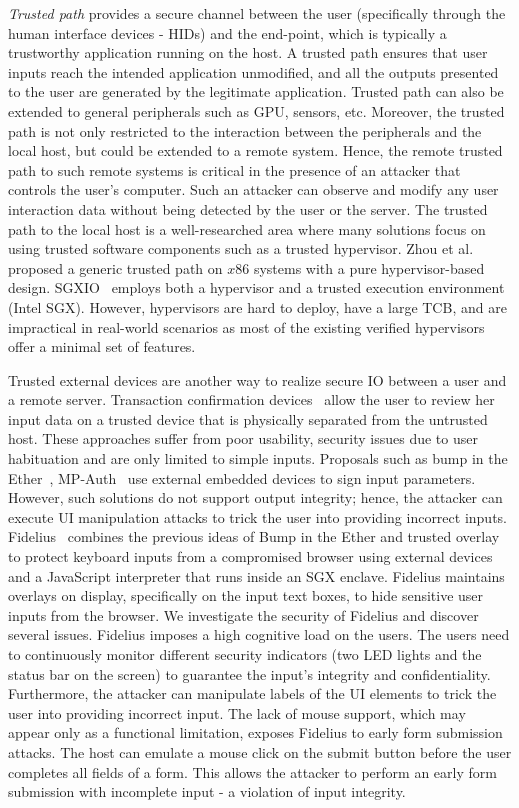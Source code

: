 \emph{Trusted path} provides a secure channel between the user (specifically through the human interface devices - HIDs) and the end-point, which is typically a trustworthy application running on the host. A trusted path ensures that user inputs reach the intended application unmodified, and all the outputs presented to the user are generated by the legitimate application. Trusted path can also be extended to general peripherals such as GPU, sensors, etc. Moreover, the trusted path is not only restricted to the interaction between the peripherals and the local host, but could be extended to a remote system. Hence, the remote trusted path to such remote systems is critical in the presence of an attacker that controls the user's computer. Such an attacker can observe and modify any user interaction data without being detected by the user or the server. The trusted path to the local host is a well-researched area where many solutions focus on using trusted software components such as a trusted hypervisor. Zhou et al.~\cite{zhou2012building} proposed a generic trusted path on $x86$ systems with a pure hypervisor-based design. SGXIO~\cite{weiser2017sgxio} employs both a hypervisor and a trusted execution environment (Intel SGX). However, hypervisors are hard to deploy, have a large TCB, and are impractical in real-world scenarios as most of the existing verified hypervisors offer a minimal set of features.


Trusted external devices are another way to realize secure IO between a user and a remote server. Transaction confirmation devices~\cite{filyanov2011uni,weigold2011secure} allow the user to review her input data on a trusted device that is physically separated from the untrusted host. These approaches suffer from poor usability, security issues due to user habituation and are only limited to simple inputs. Proposals such as bump in the Ether~\cite{McCPerRei2006}, MP-Auth~\cite{mannan2007using} use external embedded devices to sign input parameters. However, such solutions do not support output integrity; hence, the attacker can execute UI manipulation attacks to trick the user into providing incorrect inputs. Fidelius~\cite{Fidelius} combines the previous ideas of Bump in the Ether and trusted overlay to protect keyboard inputs from a compromised browser using external devices and a JavaScript interpreter that runs inside an SGX enclave. Fidelius maintains overlays on display, specifically on the input text boxes, to hide sensitive user inputs from the browser. We investigate the security of Fidelius and discover several issues. Fidelius imposes a high cognitive load on the users. The users need to continuously monitor different security indicators (two LED lights and the status bar on the screen) to guarantee the input's integrity and confidentiality. Furthermore, the attacker can manipulate labels of the UI elements to trick the user into providing incorrect input. 
The lack of mouse support, which may appear only as a functional limitation, exposes Fidelius to early form submission attacks. The host can emulate a mouse click on the submit button before the user completes all fields of a form. This allows the attacker to perform an early form submission with incomplete input - a violation of input integrity. 

